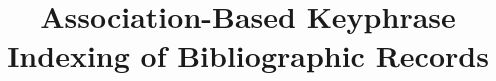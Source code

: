 \documentclass[11pt]{article}
\title{Association-Based Keyphrase Indexing of Bibliographic Records}
\date{}
\begin{document}
  \maketitle
  \begin{abstract}
  \end{abstract}

  
  
  
  
  
  
  
  


  
  
\end{document}

